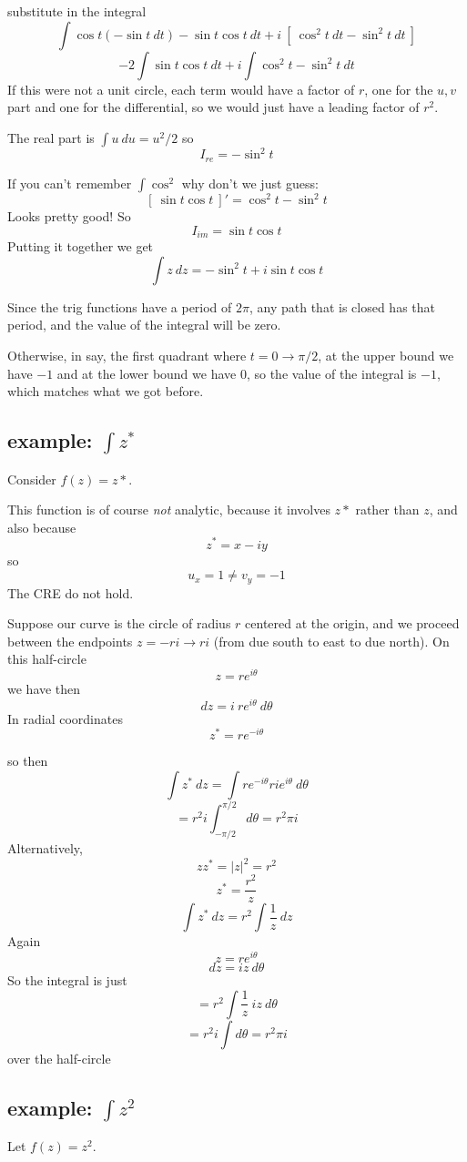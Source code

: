\documentclass[11pt, oneside]{article}
\begin{document}
substitute in the integral
\[ \int \cos t (- \sin t \ dt) - \sin t \cos t \ dt + i \ [ \ \cos^2 t \ dt - \sin^2 t \ dt \ ] \]
\[ -2 \int \sin t \cos t \ dt + i \int  \cos^2 t - \sin^2 t \ dt \]
If this were not a unit circle, each term would have a factor of $r$, one for the $u,v$ part and one for the differential, so we would just have a leading factor of $r^2$.

The real part is $\int u \ du = u^2/2$ so
\[ I_{re} = - \sin^2 t \]

If you can't remember $\int \cos^2$ why don't we just guess:
\[ [ \ \sin t \cos t \ ]' = \cos^2 t - \sin^2 t \]
Looks pretty good!  So
\[ I_{im} = \sin t \cos t \]
Putting it together we get
\[ \int z \ dz = - \sin^2 t + i \sin t \cos t \]

Since the trig functions have a period of $2 \pi$, any path that is closed has that period, and the value of the integral will be zero.

Otherwise, in say, the first quadrant where $t = 0 \rightarrow \pi/2$, at the upper bound we have $-1$ and at the lower bound we have $0$, so the value of the integral is $-1$, which matches what we got before.

\subsection*{example:  $\int z^*$}

Consider $f(z) = z*$.

This function is of course \emph{not} analytic, because it involves $z*$ rather than $z$, and also because
\[ z^* = x - iy \]
so
\[ u_x = 1 \ne v_y = - 1 \]
The CRE do not hold.

Suppose our curve is the circle of radius $r$ centered at the origin, and we proceed between the endpoints $z = -ri \rightarrow ri$ (from due south to east to due north).  On this half-circle 
\[ z = re^{i \theta} \]
we have then
\[ dz = i \ re^{i \theta} \ d \theta \]
In radial coordinates
\[ z^* = re^{-i\theta} \]

so then
\[ \int {z^*} \ dz = \int r e^{-i\theta} r i e^{i \theta} \ d \theta \]
\[ = r^2 i \int_{-\pi/2}^{\pi/2} d \theta = r^2 \pi i \]
Alternatively,
\[ zz^* = |z|^2 = r^2  \]
\[ z^* = \frac{r^2}{z} \]
\[ \int {z^*} \ dz = r^2 \int \frac{1}{z} \ dz \]
Again
\[ z = re^{i \theta} \]
\[ dz = iz \ d \theta \]
So the integral is just
\[ = r^2 \int \frac{1}{z} \ iz \ d \theta   \]
\[ = r^2 i \int d \theta = r^2 \pi i \]
over the half-circle

\subsection*{example:  $\int z^2$}
Let $f(z) = z^2$.  
\end{document}
